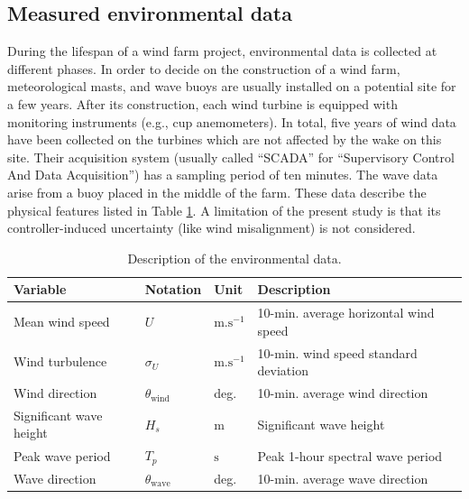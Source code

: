 \subsection{Measured environmental data}
During the lifespan of a wind farm project, environmental data is collected at different phases. 
In order to decide on the construction of a wind farm, meteorological masts, and wave buoys are usually installed on a potential site for a few years. 
After its construction, each wind turbine is equipped with monitoring instruments (e.g., cup anemometers). 
In total, five years of wind data have been collected on the turbines which are not affected by the wake on this site. 
Their acquisition system (usually called ``SCADA'' for ``Supervisory Control And Data Acquisition'') has a sampling period of ten minutes. 
The wave data arise from a buoy placed in the middle of the farm. 
These data describe the physical features listed in Table \ref{tab:envi_variables_c4}. 
A limitation of the present study is that its controller-induced uncertainty (like wind misalignment) is not considered. 

\begin{table} 
    \begin{center}
    \caption{Description of the environmental data.}
    \begin{tabularx}{\textwidth}{@{\extracolsep\fill}llll@{}}
    \hline
    Variable & Notation & Unit & Description\\
    \hline
    Mean wind speed & $U$ & $\mathrm{m.s^{-1}}$ & 10-min. average horizontal wind speed\\
    Wind turbulence & $\sigma_U $ & $\mathrm{m.s^{-1}}$ & 10-min. wind speed standard deviation\\
    Wind direction\footnotemark & $\theta_{\mathrm{wind}} $ & deg. &  10-min. average wind direction\\
    Significant wave height & $H_s $ & m & Significant wave height\\
    Peak wave period & $T_p $  & $\mathrm{s}$ & Peak 1-hour spectral wave period \\
    Wave direction & $\theta_{\mathrm{wave}} $ & deg. &  10-min. average wave direction\\
    \hline
    \end{tabularx}
    \label{tab:envi_variables_c4}
    \end{center}
\end{table}

